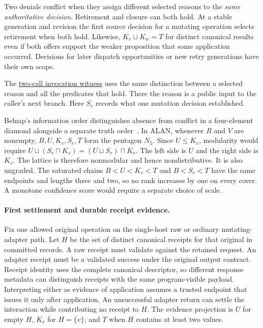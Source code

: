 \documentclass[11pt,a4paper]{article}
\theoremstyle{definition}
\theoremstyle{remark}
\begin{document}
Two denials conflict when they assign different selected reasons to the \emph{same authoritative decision}. Retirement and closure can both hold. At a stable generation and revision the first source decision for a mutating operation selects retirement when both hold. Likewise, $K_v\sqcup K_w=T$ for distinct canonical results even if both offers support the weaker proposition that some application occurred. Decisions for later dispatch opportunities or new retry generations have their own scope.

The \hyperref[par:peer-refusal-witness]{two-call invocation witness} uses the same distinction between a selected reason and all the predicates that hold. There the reason is a public input to the caller's next branch. Here $S_r$ records what one mutation decision established.

Belnap's information order distinguishes absence from conflict in a four-element diamond alongside a separate truth order~\cite{belnap1977useful}. In ALAN, whenever $R$ and $V$ are nonempty, $B,U,K_v,S_r,T$ form the pentagon $N_5$. Since $U\le K_v$, modularity would require $U\sqcup(S_r\sqcap K_v)=(U\sqcup S_r)\sqcap K_v$. The left side is $U$ and the right side is $K_v$. The lattice is therefore nonmodular and hence nondistributive. It is also ungraded. The saturated chains $B<U<K_v<T$ and $B<S_r<T$ have the same endpoints and lengths three and two, so no rank increases by one on every cover. A monotone confidence score would require a separate choice of scale.

\paragraph{First settlement and durable receipt evidence.}
Fix one allowed original operation on the single-host raw or ordinary mutating-adapter path. Let $H$ be the set of distinct canonical receipts for that original in committed records. A raw receipt must validate against the retained request. An adapter receipt must be a validated success under the original output contract. Receipt identity uses the complete canonical descriptor, so different response metadata can distinguish receipts with the same program-visible payload. Interpreting either as evidence of application assumes a trusted endpoint that issues it only after application. An unsuccessful adapter return can settle the interaction while contributing no receipt to $H$. The evidence projection is $U$ for empty $H$, $K_v$ for $H=\{v\}$, and $T$ when $H$ contains at least two values.
\end{document}
